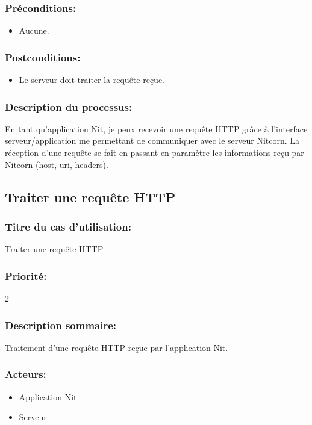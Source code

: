 \documentclass{scrreprt}
\begin{document}
\subsubsection{Préconditions:}
\begin{itemize}
    \item Aucune.  
\end{itemize} 

\subsubsection{Postconditions:}
\begin{itemize}
    \item Le serveur doit traiter la requête reçue.
\end{itemize} 

\subsubsection{Description du processus:}
En tant qu'application Nit, je peux recevoir une requête HTTP grâce à l'interface
serveur/application me permettant de communiquer avec le serveur
Nitcorn. La réception d'une requête se fait en passant en paramètre les informations
reçu par Nitcorn (host, uri, headers).

\subsection{Traiter une requête HTTP}

\subsubsection{Titre du cas d'utilisation:} Traiter une requête HTTP
\subsubsection{Priorité:} 2
\subsubsection{Description sommaire:}
Traitement d'une requête HTTP reçue par l'application Nit.

\subsubsection{Acteurs:}
\begin{itemize}
    \item Application Nit
    \item Serveur
\end{itemize}
\end{document}
